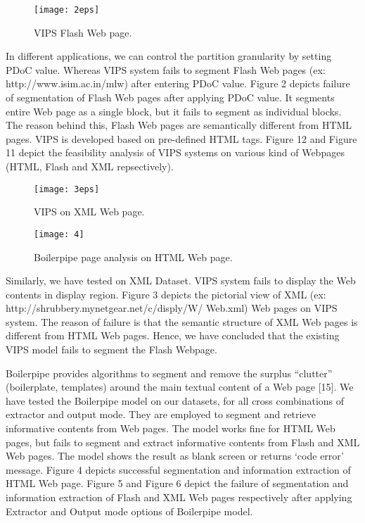 \documentclass[fleqn,twoside]{article}
\begin{document}
\begin{figure*}[!ht]
\centering
\texttt{[image: 2eps]}\\
\caption{VIPS Flash Web page.}
\end{figure*}
\vskip 2mm
In different applications, we can control the partition granularity by setting PDoC value. Whereas VIPS system fails to segment Flash Web pages (ex: http://www.isim.ac.in/mlw) after entering PDoC value. Figure 2 depicts failure of segmentation of Flash Web pages after applying PDoC value. It segments entire Web page as a single block, but it fails to segment as individual blocks. The reason behind this, Flash Web pages are semantically different from HTML pages. VIPS is developed based on pre-defined HTML tags.
Figure 12 and Figure 11 depict the feasibility analysis of VIPS systems on various kind of Webpages (HTML, Flash and XML repsectively). 
 

\begin{figure*}[!ht]
\centering
\texttt{[image: 3eps]}
\caption{VIPS on XML Web page.}
\end{figure*}

\begin{figure*}[!ht]
\centering
\texttt{[image: 4]}
\caption{Boilerpipe page analysis on HTML Web page.}
\end{figure*}

\vskip 2mm
Similarly, we have tested on XML Dataset.  VIPS system fails to display the Web contents in display region. Figure 3 depicts the pictorial view of XML (ex: http://shrubbery.mynetgear.net/c/disply/W/ Web.xml) Web pages on VIPS system. The reason of failure is that the semantic structure of XML Web pages is different from HTML Web pages. Hence, we have concluded that the existing VIPS model fails to segment the Flash Webpage.




\vskip 2mm
Boilerpipe provides algorithms to segment and remove the surplus “clutter” (boilerplate, templates) around the main textual content of a Web page [15].  We have tested the Boilerpipe model on our datasets, for all cross combinations of extractor and output mode. They are employed to segment and retrieve informative contents from Web pages. The model works fine for HTML Web pages, but fails to segment and extract informative contents from Flash and XML Web pages. The model shows the result as blank screen or returns ‘code error’ message. Figure 4 depicts successful segmentation and information extraction of HTML Web page. Figure 5 and Figure 6 depict the failure of segmentation and information extraction of Flash and XML Web pages respectively after applying Extractor and Output mode options of Boilerpipe model.
\end{document}
